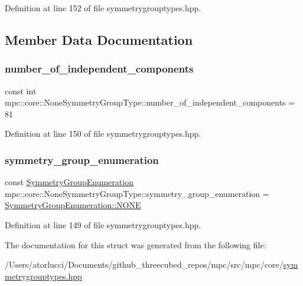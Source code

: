 Definition at line 152 of file symmetrygrouptypes.\+hpp.



\subsection{Member Data Documentation}
\mbox{\label{structmpc_1_1core_1_1_none_symmetry_group_type_a7a42df9f755da6327c802277a8417eba}} 
\subsubsection{\texorpdfstring{number\+\_\+of\+\_\+independent\+\_\+components}{number\_of\_independent\_components}}
{\footnotesize\ttfamily const int mpc\+::core\+::\+None\+Symmetry\+Group\+Type\+::number\+\_\+of\+\_\+independent\+\_\+components = 81}



Definition at line 150 of file symmetrygrouptypes.\+hpp.

\mbox{\label{structmpc_1_1core_1_1_none_symmetry_group_type_a602e3f58d42e2e828e149d4945958984}} 
\subsubsection{\texorpdfstring{symmetry\+\_\+group\+\_\+enumeration}{symmetry\_group\_enumeration}}
{\footnotesize\ttfamily const \mbox{\hyperlink{namespacempc_1_1core_a9d979684062547055a0ef5c13077bad8}{Symmetry\+Group\+Enumeration}} mpc\+::core\+::\+None\+Symmetry\+Group\+Type\+::symmetry\+\_\+group\+\_\+enumeration = \mbox{\hyperlink{namespacempc_1_1core_a9d979684062547055a0ef5c13077bad8ab50339a10e1de285ac99d4c3990b8693}{Symmetry\+Group\+Enumeration\+::\+N\+O\+NE}}}



Definition at line 149 of file symmetrygrouptypes.\+hpp.



The documentation for this struct was generated from the following file\+:\begin{DoxyCompactItemize}
\item 
/\+Users/atorlucci/\+Documents/github\+\_\+threecubed\+\_\+repos/mpc/src/mpc/core/\mbox{\hyperlink{symmetrygrouptypes_8hpp}{symmetrygrouptypes.\+hpp}}\end{DoxyCompactItemize}
